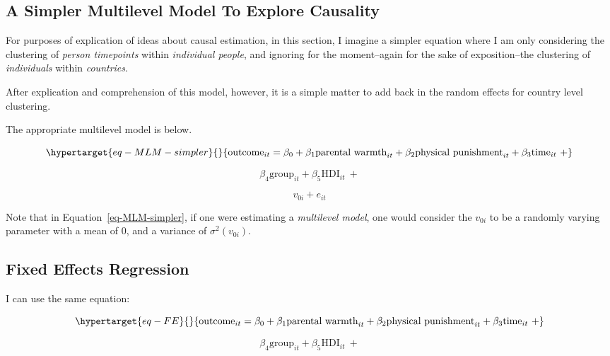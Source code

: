 \documentclass[
  letterpaper,
  DIV=11,
  numbers=noendperiod]{scrreprt}
\begin{document}
\hypertarget{a-simpler-multilevel-model-to-explore-causality}{%
\subsection{A Simpler Multilevel Model To Explore
Causality}\label{a-simpler-multilevel-model-to-explore-causality}}

For purposes of explication of ideas about causal estimation, in this
section, I imagine a simpler equation where I am only considering the
clustering of \emph{person timepoints} within \emph{individual people},
and ignoring for the moment--again for the sake of exposition--the
clustering of \emph{individuals} within \emph{countries}.

After explication and comprehension of this model, however, it is a
simple matter to add back in the random effects for country level
clustering.

The appropriate multilevel model is below.

\begin{equation}\protect\hypertarget{eq-MLM-simpler}{}{\text{outcome}_{it} = \beta_0 + \beta_1 \text{parental warmth}_{it} + \beta_2 \text{physical punishment}_{it} + \beta_3 \text{time}_{it} \ + }\label{eq-MLM-simpler}\end{equation}

\[\beta_4 \text{group}_{it} + \beta_5 \text{HDI}_{it} \ +\]

\[v_{0i} + e_{it}\]

Note that in Equation~\ref{eq-MLM-simpler}, if one were estimating a
\emph{multilevel model}, one would consider the \(v_{0i}\) to be a
randomly varying parameter with a mean of 0, and a variance of
\(\sigma^2(v_{0i})\).

\hypertarget{fixed-effects-regression}{%
\subsection{Fixed Effects Regression}\label{fixed-effects-regression}}

I can use the same equation:

\begin{equation}\protect\hypertarget{eq-FE}{}{\text{outcome}_{it} = \beta_0 + \beta_1 \text{parental warmth}_{it} + \beta_2 \text{physical punishment}_{it} + \beta_3 \text{time}_{it} \ + }\label{eq-FE}\end{equation}

\[\beta_4 \text{group}_{it} + \beta_5 \text{HDI}_{it} \ +\]
\end{document}
